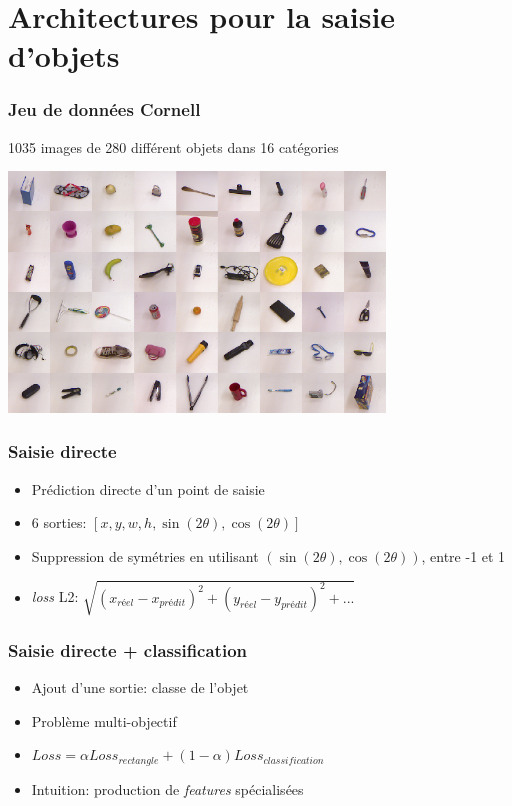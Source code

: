 \documentclass{beamer}
\begin{document}
\section{Architectures pour la saisie d'objets}
\begin{frame}
  \frametitle{Jeu de données Cornell}
  1035 images de 280 différent objets dans 16 catégories
  \begin{center}
  \includegraphics[width=0.75\textwidth]{img/cornell.png}
  \end{center}
\end{frame}

\begin{frame}
  \frametitle{Saisie directe}
  \begin{itemize}
  \item Prédiction directe d'un point de saisie
  \item 6 sorties: $[x, y, w, h, \sin(2\theta), \cos(2\theta)]$
  \item Suppression de symétries en utilisant $(\sin(2\theta), \cos(2\theta))$,
    entre -1 et 1
  \item \emph{loss} L2: $\sqrt{(x_{réel} - x_{prédit})^2 + (y_{réel} - y_{prédit})^2
    + ...}$
  \end{itemize}
  
\end{frame}

\begin{frame}
  \frametitle{Saisie directe + classification}
  \begin{itemize}
  \item Ajout d'une sortie: classe de l'objet
  \item Problème multi-objectif
  \item $Loss = \alpha Loss_{rectangle} + (1 - \alpha) Loss_{classification}$
  \item Intuition: production de \emph{features} spécialisées
  \end{itemize}
\end{frame}
\end{document}
